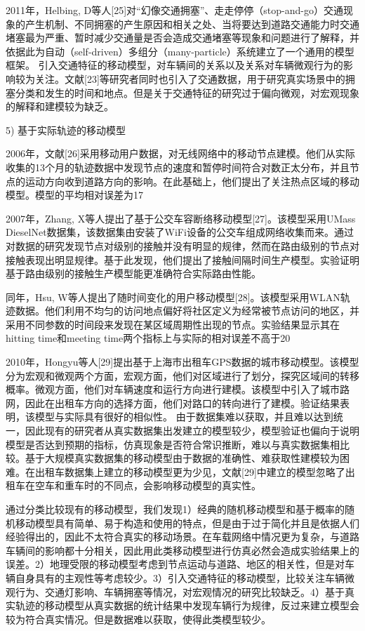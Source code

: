2011年，Helbing, D等人[25]对“幻像交通拥塞”、走走停停（stop-and-go）交通现象的产生机制、不同拥塞的产生原因和相关之处、当将要达到道路交通能力时交通堵塞最为严重、暂时减少交通量是否会造成交通堵塞等现象和问题进行了解释，并依据此为自动（self-driven）多组分（many-particle）系统建立了一个通用的模型框架。
引入交通特征的移动模型，对车辆间的关系以及关系对车辆微观行为的影响较为关注。文献[23]等研究者同时也引入了交通数据，用于研究真实场景中的拥塞分类和发生的时间和地点。但是关于交通特征的研究过于偏向微观，对宏观现象的解释和建模较为缺乏。

5) 基于实际轨迹的移动模型

2006年，文献[26]采用移动用户数据，对无线网络中的移动节点建模。他们从实际收集的13个月的轨迹数据中发现节点的速度和暂停时间符合对数正太分布，并且节点的运动方向收到道路方向的影响。在此基础上，他们提出了关注热点区域的移动模型。模型的平均相对误差为17%

2007年，Zhang, X等人提出了基于公交车容断络移动模型[27]。该模型采用UMass DieselNet数据集，该数据集由安装了WiFi设备的公交车组成网络收集而来。通过对数据的研究发现节点对级别的接触并没有明显的规律，然而在路由级别的节点对接触表现出明显规律。基于此发现，他们提出了接触间隔时间生产模型。实验证明基于路由级别的接触生产模型能更准确符合实际路由性能。

同年，Hsu, W等人提出了随时间变化的用户移动模型[28]。该模型采用WLAN轨迹数据。他们利用不均匀的访问地点偏好将社区定义为经常被节点访问的地区，并采用不同参数的时间段来发现在某区域周期性出现的节点。实验结果显示其在hitting time和meeting time两个指标上与实际的相对误差不高于20%

2010年，Hongyu等人[29]提出基于上海市出租车GPS数据的城市移动模型。该模型分为宏观和微观两个方面，宏观方面，他们对区域进行了划分，探究区域间的转移概率。微观方面，他们对车辆速度和运行方向进行建模。该模型中引入了城市路网，因此在出租车方向的选择方面，他们对路口的转向进行了建模。验证结果表明，该模型与实际具有很好的相似性。
由于数据集难以获取，并且难以达到统一，因此现有的研究者从真实数据集出发建立的模型较少，模型验证也偏向于说明模型是否达到预期的指标，仿真现象是否符合常识推断，难以与真实数据集相比较。基于大规模真实数据集的移动模型由于数据的准确性、难获取性建模较为困难。在出租车数据集上建立的移动模型更为少见，文献[29]中建立的模型忽略了出租车在空车和重车时的不同点，会影响移动模型的真实性。

通过分类比较现有的移动模型，我们发现1）经典的随机移动模型和基于概率的随机移动模型具有简单、易于构造和使用的特点，但是由于过于简化并且是依据人们经验得出的，因此不太符合真实的移动场景。在车载网络中情况更为复杂，与道路车辆间的影响都十分相关，因此用此类移动模型进行仿真必然会造成实验结果上的误差。2）地理受限的移动模型考虑到节点运动与道路、地区的相关性，但是对车辆自身具有的主观性等考虑较少。3）引入交通特征的移动模型，比较关注车辆微观行为、交通灯影响、车辆拥塞等情况，对宏观情况的研究比较缺乏。4）基于真实轨迹的移动模型从真实数据的统计结果中发现车辆行为规律，反过来建立模型会较为符合真实情况。但是数据难以获取，使得此类模型较少。


